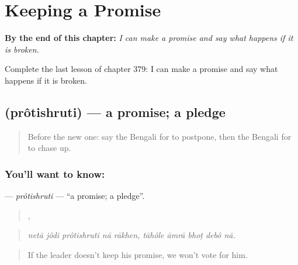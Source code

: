
\chapter{Keeping a Promise}
\label{ch:bn-keeping-a-promise}

\begin{chapteropening}
\textbf{By the end of this chapter:} \emph{I can make a promise and say what happens if it is broken.}

Complete the last lesson of chapter 379: I can make a promise and say what happens if it is broken.
\end{chapteropening}

\section[\texorpdfstring{\bn{প্রতিশ্রুতি} (prôtishruti)}{প্রতিশ্রুতি (prôtishruti)}]{ (prôtishruti) — a promise; a pledge}

\label{lesson:BN-C379-protishruti}



\begin{quote}
Before the new one: say the Bengali for to postpone, then the Bengali for to chase up.
\end{quote}

\subsection*{You'll want to know: }
\textbf{} — \emph{prôtishruti} — \textquotedblleft{}a promise; a pledge\textquotedblright{}.

\begin{quote}
    ,     
\end{quote}

\begin{quote}
\emph{netā jôdi prôtishruti nā rākhen, tāhôle āmrā bhoṭ debô nā.}
\end{quote}

\begin{quote}
If the leader doesn't keep his promise, we won't vote for him.
\end{quote}

